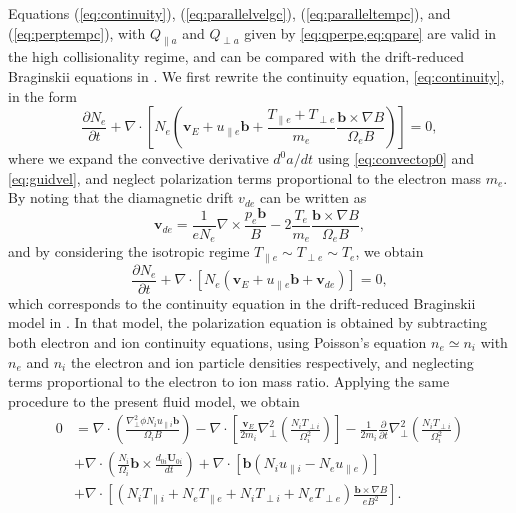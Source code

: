 {{{Equations (\ref{eq:continuity}), (\ref{eq:parallelvelgc}), (\ref{eq:paralleltempc}), and (\ref{eq:perptempc}), with $Q_{\parallel a}$ and $Q_{\perp a}$ given by \cref{eq:qperpe,eq:qpare} are valid in the high collisionality regime, and can be compared with the drift-reduced Braginskii equations in \citet{Zeiler1997}. We first rewrite the continuity equation, \cref{eq:continuity}, in the form
\begin{equation}
    \frac{\partial N_e}{\partial t} + \nabla \cdot \left[N_e\left(\mathbf v_E + u_{\parallel e} \mathbf b+  \frac{T_{\parallel e}+T_{\perp e}}{m_e}\frac{\mathbf b \times \nabla B}{\Omega_e B} \right)\right]
    =0,
\end{equation}
\noindent where we expand the convective derivative $d^0{a}/dt$ using \cref{eq:convectop0} and \cref{eq:guidvel}, and neglect polarization terms proportional to the electron mass $m_e$. By noting that the diamagnetic drift $v_{de}$ can be written as 
\begin{equation}
    \mathbf v_{de} = \frac{1}{e N_e}\nabla \times \frac{p_e \mathbf b}{B}-2\frac{T_e}{m_e}\frac{\mathbf b \times \nabla B}{\Omega_e B},
\end{equation}
\noindent and by considering the isotropic regime $T_{\parallel e} \sim T_{\perp e} \sim T_{e}$, we obtain
\begin{equation}
    \frac{\partial N_e}{\partial t} + \nabla \cdot \left[N_e\left(\mathbf v_E + u_{\parallel e} \mathbf b+  \mathbf v_{de} \right)\right]
    =0,
\end{equation}
\noindent which corresponds to the continuity equation in the drift-reduced Braginskii model in \citet{Zeiler1997}. In {that model}, the polarization equation is obtained by subtracting both electron and ion continuity equations, using Poisson's equation $n_e \simeq n_i$ with $n_e$ and $n_i$ the electron and ion particle densities respectively, and neglecting {terms proportional to} the electron to ion mass ratio. Applying the same procedure to the present fluid model, we obtain
%
\begin{equation}
\begin{split}
    0&=\nabla \cdot \left(\frac{\nabla_\perp^2 \phi N_i u_{\parallel i} \mathbf b}{\Omega_i B}\right)-\nabla \cdot \left[\frac{\mathbf v_E}{2 m_i}\nabla_\perp^2\left(\frac{N_i T_{\perp i}}{\Omega_i^2}\right)\right]-\frac{1}{2m_i}\frac{\partial}{\partial t}\nabla_\perp^2 \left(\frac{N_i T_{\perp i}}{\Omega_i^2}\right)\\
    &+\nabla \cdot \left(\frac{N_i}{\Omega_i}\mathbf b \times \frac{d_{0i}\mathbf U_{0i}}{dt}\right)+\nabla \cdot \left[\mathbf b\left(N_i u_{\parallel i} - N_e u_{\parallel e}\right)\right]\\
    &+\nabla \cdot \left[\left({N_i T_{\parallel i}+N_eT_{\parallel e}+N_i T_{\perp i}+N_eT_{\perp e}}\right)\frac{\mathbf b \times \nabla B}{e B^2}\right].
\end{split}
\label{eq:gcpolarizationeq}
\end{equation}

}}}
